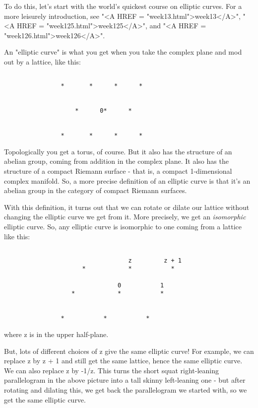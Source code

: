 To do this, let's start with the world's quickest course on 
elliptic curves.  For a more leisurely introduction, see "<A HREF = "week13.html">week13</A>", 
"<A HREF = "week125.html">week125</A>", and "<A HREF = "week126.html">week126</A>".

An "elliptic curve" is what you get when you take the
complex plane and mod out by a lattice, like this:

                  

\begin{verbatim}

                *       *      *      *

                             
                    *      0*      *                


                *       *      *      *
\end{verbatim}
    
Topologically you get a torus, of course.  But it also
has the structure of an abelian group, coming from addition
in the complex plane.  It also has the structure of a compact
Riemann surface - that is, a compact 1-dimensional complex manifold. 
So, a more precise definition of an elliptic curve is that it's 
an abelian group in the category of compact Riemann surfaces.

With this definition, it turns out that we can rotate or dilate
our lattice without changing the elliptic curve we get from it.  
More precisely, we get an \emph{isomorphic} elliptic curve.  So, any 
elliptic curve is isomorphic to one coming from a lattice like this:



\begin{verbatim}

                                   z         z + 1 
                      *            *           *
 
                                0           1
                   *            *           *
               
 
                *           *           *
\end{verbatim}
    
where z is in the upper half-plane.  

But, lots of different choices of z give the same elliptic 
curve!  For example, we can replace z by z + 1 and still get
the same lattice, hence the same elliptic curve.  We can also 
replace z by -1/z.  This turns the short squat right-leaning 
parallelogram in the above picture into a tall skinny left-leaning 
one - but after rotating and dilating this, we get back the 
parallelogram we started with, so we get the same elliptic curve.

